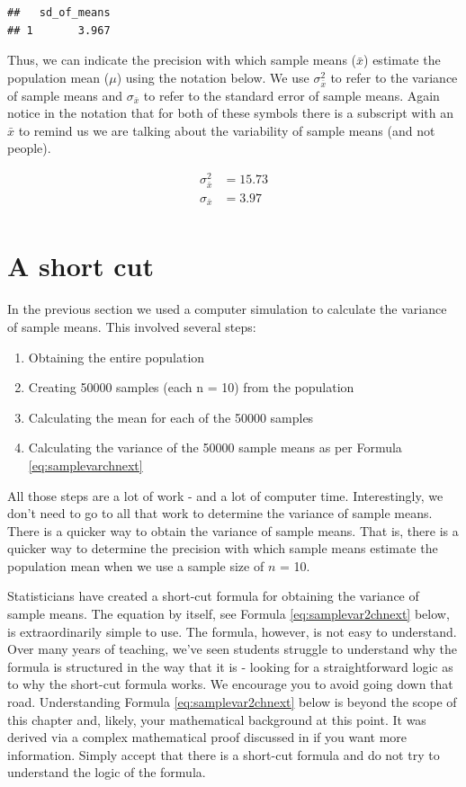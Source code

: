 \documentclass[
]{krantz}
\providecommand{\tightlist}{%
  \setlength{\itemsep}{0pt}\setlength{\parskip}{0pt}}
\begin{document}
\begin{verbatim}
##   sd_of_means
## 1       3.967
\end{verbatim}

Thus, we can indicate the precision with which sample means (\(\bar{x}\)) estimate the population mean (\(\mu\)) using the notation below. We use \(\sigma_{\bar{x}}^2\) to refer to the variance of sample means and \(\sigma_{\bar{x}}\) to refer to the standard error of sample means. Again notice in the notation that for both of these symbols there is a subscript with an \(\bar{x}\) to remind us we are talking about the variability of sample means (and not people).

\[
\begin{aligned} 
\sigma_{\bar{x}}^2 &= 15.73 \\
\sigma_{\bar{x}} &= 3.97 \\
\end{aligned} 
\]

\hypertarget{a-short-cut}{%
\section{A short cut}\label{a-short-cut}}

In the previous section we used a computer simulation to calculate the variance of sample means. This involved several steps:

\begin{enumerate}
\def\labelenumi{\arabic{enumi}.}
\tightlist
\item
  Obtaining the entire population
\item
  Creating 50000 samples (each n = 10) from the population
\item
  Calculating the mean for each of the 50000 samples
\item
  Calculating the variance of the 50000 sample means as per Formula \eqref{eq:samplevarchnext}
\end{enumerate}

All those steps are a lot of work - and a lot of computer time. Interestingly, we don't need to go to all that work to determine the variance of sample means. There is a quicker way to obtain the variance of sample means. That is, there is a quicker way to determine the precision with which sample means estimate the population mean when we use a sample size of \(n\) = 10.

Statisticians have created a short-cut formula for obtaining the variance of sample means. The equation by itself, see Formula \eqref{eq:samplevar2chnext} below, is extraordinarily simple to use. The formula, however, is not easy to understand. Over many years of teaching, we've seen students struggle to understand why the formula is structured in the way that it is - looking for a straightforward logic as to why the short-cut formula works. We encourage you to avoid going down that road. Understanding Formula \eqref{eq:samplevar2chnext} below is beyond the scope of this chapter and, likely, your mathematical background at this point. It was derived via a complex mathematical proof discussed in \citet{hays1994} if you want more information. Simply accept that there is a short-cut formula and do not try to understand the logic of the formula.
\end{document}
